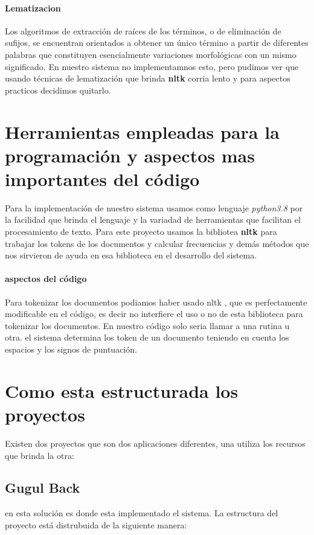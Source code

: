 \documentclass{llncs}
\begin{document}
\paragraph{Lematizacion}
Los algoritmos de extracción de ra\'ices de los t\'erminos, o de eliminaci\'on de sufijos, se encuentran orientados a obtener un \'unico término a partir de diferentes palabras que constituyen esencialmente variaciones morfol\'ogicas con un mismo significado. En nuestro sistema no implementamnos esto, pero pudimos ver que usando t\'ecnicas de lematizaci\'on que brinda \textbf{nltk} corria lento y para aspectos practicos decidimos quitarlo. 


\section{Herramientas empleadas para la programaci\'on y aspectos mas importantes del c\'odigo} 

Para la implementaci\'on de nuestro sistema usamos como lenguaje \textit{python3.8} por la facilidad que brinda el lenguaje y la variadad de herramientas que facilitan el procesamiento de texto. Para este proyecto usamos la bibliotea \textbf{nltk} para trabajar los tokens de los documentos y calcular frecuencias y dem\'as m\'etodos que nos sirvieron de ayuda en esa biblioteca en el desarrollo del sistema. 

\paragraph{aspectos del c\'odigo} Para tokenizar los documentos podiamos haber usado nltk , que es perfectamente modificable en el c\'odigo, es decir no interfiere el uso o no de esta biblioteca para tokenizar los documentos. En nuestro c\'odigo solo seria llamar a una rutina u otra. el sistema determina los token de un documento teniendo en cuenta los espacios y los signos de puntuaci\'on. 



\section{Como esta estructurada los proyectos} 
%
Existen dos proyectos que son dos aplicaciones diferentes, una utiliza los recursos que brinda la otra: 

\subsection{Gugul Back}
en esta soluci\'on es donde esta implementado el sistema. La estructura del proyecto est\'a distrubuida de la siguiente manera:
\end{document}
